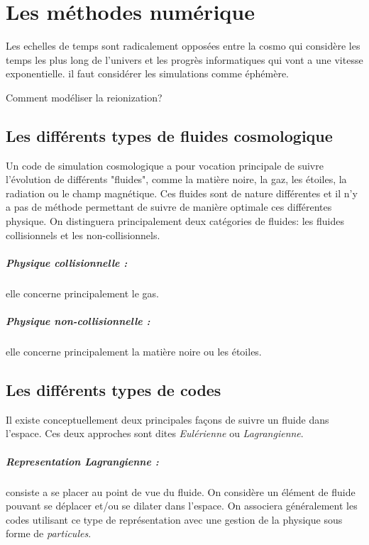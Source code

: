 \chapter{Les méthodes numérique}\label{ch:introduction}

Les echelles de temps sont radicalement opposées entre la cosmo qui considère les temps les plus long de l'univers et les progrès informatiques qui vont a une vitesse exponentielle. 
il faut considérer les simulations comme éphémère.

Comment modéliser la reionization?

\section{Les différents types de fluides cosmologique}

Un code de simulation cosmologique a pour vocation principale de suivre l'évolution de différents "fluides", comme la matière noire, la gaz, les étoiles, la radiation ou le champ magnétique.
Ces fluides sont de nature différentes et il n'y a pas de méthode permettant de suivre de manière optimale ces différentes physique.
On distinguera principalement deux catégories de fluides: les fluides collisionnels et les non-collisionnels.

\paragraph{Physique collisionnelle : } elle concerne principalement le gas.

\paragraph{Physique non-collisionnelle : } elle concerne principalement la matière noire ou les étoiles.




\section{Les différents types de codes}

Il existe conceptuellement deux principales façons de suivre un fluide dans l'espace.
Ces deux approches sont dites \emph{Eulérienne} ou \emph{Lagrangienne}.

\paragraph{Representation Lagrangienne : } 
consiste a se placer au point de vue du fluide.
On considère un élément de fluide pouvant se déplacer et/ou se dilater dans l'espace.
On associera généralement les codes utilisant ce type de représentation avec une gestion de la physique sous forme de \emph{particules}.

